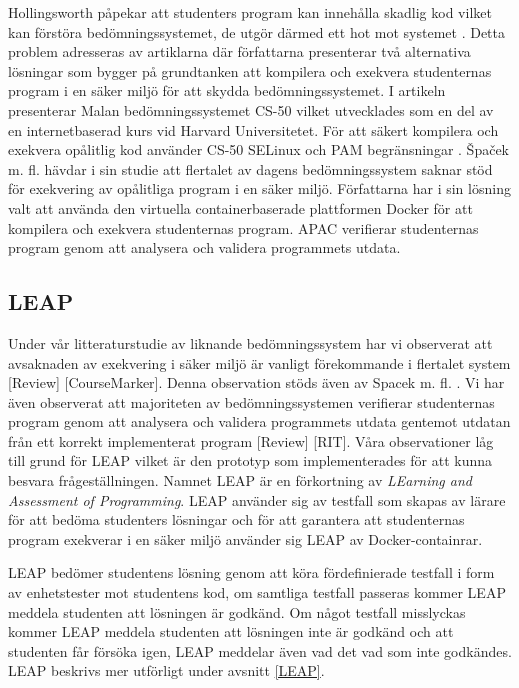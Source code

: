 \documentclass[a4paper,11pt]{article}
\begin{document}
{Hollingsworth påpekar att studenters program kan innehålla skadlig kod vilket kan förstöra bedömningssystemet, de utgör därmed ett hot mot systemet \cite{hollingsworth_2}. Detta problem adresseras av artiklarna \cite{spacek_13} \cite{cs50_8} \cite{ihantola} där författarna presenterar två alternativa lösningar som bygger på grundtanken att kompilera och exekvera studenternas program i en säker miljö för att skydda bedömningssystemet. I artikeln \cite{cs50_8} presenterar Malan bedömningssystemet CS-50 vilket utvecklades som en del av en internetbaserad kurs vid Harvard Universitetet. För att säkert kompilera och exekvera opålitlig kod använder CS-50 SELinux \cite{selinux} och PAM begränsningar \cite{pambegransningar}. Špaček m. fl. \cite{spacek_13} hävdar i sin studie att flertalet av dagens bedömningssystem saknar stöd för exekvering av opålitliga program i en säker miljö. Författarna har i sin lösning valt att använda den virtuella containerbaserade plattformen Docker \cite{docker} för att kompilera och exekvera studenternas program. APAC verifierar studenternas program genom att analysera och validera programmets utdata.

\subsection{LEAP}

Under vår litteraturstudie av liknande bedömningssystem har vi observerat att avsaknaden av exekvering i säker miljö är vanligt förekommande i flertalet system [Review] \cite{roboprof_4} [CourseMarker]. Denna observation stöds även av Spacek m. fl. \cite{spacek_13}. Vi har även observerat att majoriteten av bedömningssystemen verifierar studenternas program genom att analysera och validera programmets utdata gentemot utdatan från ett korrekt implementerat program [Review] [RIT]. Våra observationer låg till grund för LEAP vilket är den prototyp som implementerades för att kunna besvara frågeställningen. Namnet LEAP är en förkortning av \textit{LEarning and Assessment of Programming}. LEAP använder sig av testfall som skapas av lärare för att bedöma studenters lösningar och för att garantera att studenternas program exekverar i en säker miljö använder sig LEAP av Docker-containrar.

LEAP bedömer studentens lösning genom att köra fördefinierade testfall i form av enhetstester mot studentens kod, om samtliga testfall passeras kommer LEAP meddela studenten att lösningen är godkänd. Om något testfall misslyckas kommer LEAP meddela studenten att lösningen inte är godkänd och att studenten får försöka igen, LEAP meddelar även vad det vad som inte godkändes. LEAP beskrivs mer utförligt under avsnitt \ref{LEAP}.


}
\end{document}
